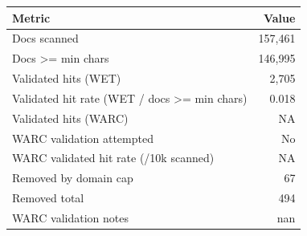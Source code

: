 \begin{tabular}{lr}
\toprule
Metric & Value \\
\midrule
Docs scanned & 157,461 \\
Docs >= min chars & 146,995 \\
Validated hits (WET) & 2,705 \\
Validated hit rate (WET / docs >= min chars) & 0.018 \\
Validated hits (WARC) & NA \\
WARC validation attempted & No \\
WARC validated hit rate (/10k scanned) & NA \\
Removed by domain cap & 67 \\
Removed total & 494 \\
WARC validation notes & nan \\
\bottomrule
\end{tabular}
